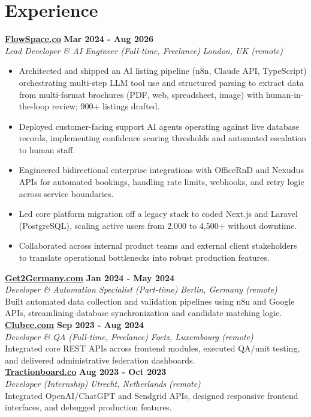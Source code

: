 \documentclass[a4paper,10pt]{article}
\newcommand{\role}[4]{%
  \textbf{#1} \hfill \textbf{#2}\\[1pt]%
  \textit{#3} \hfill \textit{#4}\\[2pt]%
}
\begin{document}
\section{Experience}

\role{\href{https://flowspace.co}{FlowSpace.co}}{Mar 2024 - Aug 2026}{Lead Developer \& AI Engineer (Full-time, Freelance)}{London, UK (remote)}
\begin{itemize}
  \item Architected and shipped an AI listing pipeline (n8n, Claude API, TypeScript) orchestrating multi-step LLM tool use and structured parsing to extract data from multi-format brochures (PDF, web, spreadsheet, image) with human-in-the-loop review; 900+ listings drafted.
  \item Deployed customer-facing support AI agents operating against live database records, implementing confidence scoring thresholds and automated escalation to human staff.
  \item Engineered bidirectional enterprise integrations with OfficeRnD and Nexudus APIs for automated bookings, handling rate limits, webhooks, and retry logic across service boundaries.
  \item Led core platform migration off a legacy stack to coded Next.js and Laravel (PostgreSQL), scaling active users from 2,000 to 4,500+ without downtime.
  \item Collaborated across internal product teams and external client stakeholders to translate operational bottlenecks into robust production features.
\end{itemize}

\role{\href{https://get2germany.com}{Get2Germany.com}}{Jan 2024 - May 2024}{Developer \& Automation Specialist (Part-time)}{Berlin, Germany (remote)}
Built automated data collection and validation pipelines using n8n and Google APIs, streamlining database synchronization and candidate matching logic.\\[1pt]

\role{\href{https://clubee.com}{Clubee.com}}{Sep 2023 - Aug 2024}{Developer \& QA (Full-time, Freelance)}{Foetz, Luxembourg (remote)}
Integrated core REST APIs across frontend modules, executed QA/unit testing, and delivered administrative federation dashboards.\\[1pt]

\role{\href{https://tractionboard.co}{Tractionboard.co}}{Aug 2023 - Oct 2023}{Developer (Internship)}{Utrecht, Netherlands (remote)}
Integrated OpenAI/ChatGPT and Sendgrid APIs, designed responsive frontend interfaces, and debugged production features.
\end{document}
